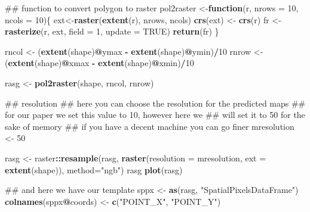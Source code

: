 \documentclass[]{book}
\newenvironment{Shaded}{\begin{snugshade}}{\end{snugshade}}
\newcommand{\ControlFlowTok}[1]{\textcolor[rgb]{0.13,0.29,0.53}{\textbf{#1}}}
\newcommand{\DataTypeTok}[1]{\textcolor[rgb]{0.13,0.29,0.53}{#1}}
\newcommand{\DecValTok}[1]{\textcolor[rgb]{0.00,0.00,0.81}{#1}}
\newcommand{\KeywordTok}[1]{\textcolor[rgb]{0.13,0.29,0.53}{\textbf{#1}}}
\newcommand{\NormalTok}[1]{#1}
\newcommand{\OperatorTok}[1]{\textcolor[rgb]{0.81,0.36,0.00}{\textbf{#1}}}
\newcommand{\OtherTok}[1]{\textcolor[rgb]{0.56,0.35,0.01}{#1}}
\newcommand{\StringTok}[1]{\textcolor[rgb]{0.31,0.60,0.02}{#1}}
\begin{document}
\begin{Shaded}
\begin{Highlighting}[]
\NormalTok{## function to convert polygon to raster}
\NormalTok{pol2raster <-}\ControlFlowTok{function}\NormalTok{(r,  }\DataTypeTok{nrows =} \DecValTok{10}\NormalTok{, }\DataTypeTok{ncols =} \DecValTok{10}\NormalTok{)\{}
\NormalTok{  ext<-}\KeywordTok{raster}\NormalTok{(}\KeywordTok{extent}\NormalTok{(r), nrows, ncols)}
  \KeywordTok{crs}\NormalTok{(ext) <-}\StringTok{ }\KeywordTok{crs}\NormalTok{(r)}
\NormalTok{  fr <-}\StringTok{ }\KeywordTok{rasterize}\NormalTok{(r, ext, }\DataTypeTok{field =} \DecValTok{1}\NormalTok{, }\DataTypeTok{update =} \OtherTok{TRUE}\NormalTok{)}
  \KeywordTok{return}\NormalTok{(fr)}
\NormalTok{\}}

\NormalTok{rncol <-}\StringTok{ }\NormalTok{(}\KeywordTok{extent}\NormalTok{(shape)}\OperatorTok{@}\NormalTok{ymax }\OperatorTok{-}\StringTok{ }\KeywordTok{extent}\NormalTok{(shape)}\OperatorTok{@}\NormalTok{ymin)}\OperatorTok{/}\DecValTok{10}
\NormalTok{rnrow <-}\StringTok{ }\NormalTok{(}\KeywordTok{extent}\NormalTok{(shape)}\OperatorTok{@}\NormalTok{xmax }\OperatorTok{-}\StringTok{ }\KeywordTok{extent}\NormalTok{(shape)}\OperatorTok{@}\NormalTok{xmin)}\OperatorTok{/}\DecValTok{10}

\NormalTok{rasg <-}\StringTok{ }\KeywordTok{pol2raster}\NormalTok{(shape, rncol, rnrow)}

\NormalTok{## resolution}
\NormalTok{## here you can choose the resolution for the predicted maps}
\NormalTok{## for our paper we set this value to 10, however here we }
\NormalTok{## will set it to 50 for the sake of memory}
\NormalTok{## if you have a decent machine you can go finer}
\NormalTok{mresolution <-}\StringTok{ }\DecValTok{50}

\NormalTok{rasg <-}\StringTok{ }\NormalTok{raster}\OperatorTok{::}\KeywordTok{resample}\NormalTok{(rasg, }
                         \KeywordTok{raster}\NormalTok{(}\DataTypeTok{resolution =}\NormalTok{ mresolution, }\DataTypeTok{ext =} \KeywordTok{extent}\NormalTok{(shape)), }
                         \DataTypeTok{method=}\StringTok{"ngb"}\NormalTok{)}
\NormalTok{rasg}
\KeywordTok{plot}\NormalTok{(rasg)}

\NormalTok{## and here we have our template}
\NormalTok{sppx <-}\StringTok{ }\KeywordTok{as}\NormalTok{(rasg, }\StringTok{"SpatialPixelsDataFrame"}\NormalTok{)}
\KeywordTok{colnames}\NormalTok{(sppx}\OperatorTok{@}\NormalTok{coords) <-}\StringTok{ }\KeywordTok{c}\NormalTok{(}\StringTok{"POINT_X"}\NormalTok{, }\StringTok{"POINT_Y"}\NormalTok{)}
\end{Highlighting}
\end{Shaded}
\end{document}
